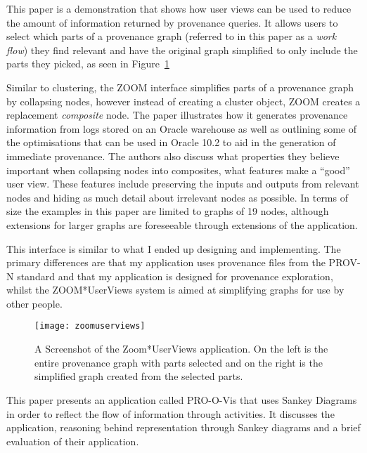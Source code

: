This paper is a demonstration that shows how user views can be used to reduce the amount of information returned by provenance queries. It allows users to select which parts of a provenance graph (referred to in this paper as a \textit{work flow}) they find relevant and have the original graph simplified to only include the parts they picked, as seen in Figure~\ref{fig:zoomuserviews}

Similar to clustering, the ZOOM interface simplifies parts of a provenance graph by collapsing nodes, however instead of creating a cluster object, ZOOM creates a replacement \textit{composite} node. The paper illustrates how it generates provenance information from logs stored on an Oracle warehouse as well as outlining some of the optimisations that can be used in Oracle 10.2 to aid in the generation of immediate provenance. The authors also discuss what properties they believe important when collapsing nodes into composites, what features make a ``good'' user view. These features include preserving the inputs and outputs from relevant nodes and hiding as much detail about irrelevant nodes as possible. In terms of size the examples in this paper are limited to graphs of 19 nodes, although extensions for larger graphs are foreseeable through extensions of the application.

This interface is similar to what I ended up designing and implementing. The primary differences are that my application uses provenance files from the PROV-N standard and that my application is designed for provenance exploration, whilst the ZOOM*UserViews system is aimed at simplifying graphs for use by other people.

\begin{figure}[h]
	\centering
	\texttt{[image: zoomuserviews]}
	\caption{A Screenshot of the Zoom*UserViews application. On the left is the entire provenance graph with parts selected and on the right is the simplified graph created from the selected parts.}
	\label{fig:zoomuserviews}
\end{figure}


This paper presents an application called PRO-O-Vis that uses Sankey Diagrams in order to reflect the flow of information through activities. It discusses the application, reasoning behind representation through Sankey diagrams and a brief evaluation of their application.

